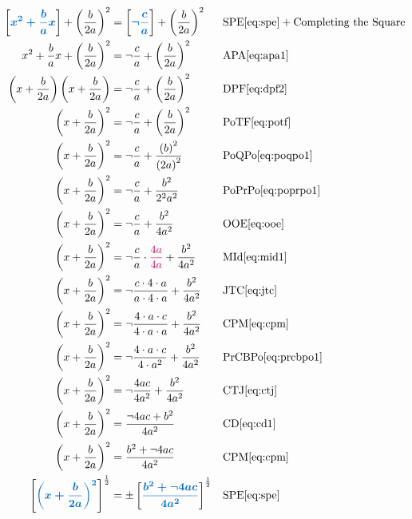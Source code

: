 \documentclass[20150903-160354-rs2.2-MarksMathNotebook.tex]{subfiles}
\begin{document}
\begin{align*}
\farg{x^2+\dfrac{b}{a}x}+\left( \dfrac{b}{2a} \right)^2 &= \farg{\neg \dfrac{c}{a}} + \left( \dfrac{b}{2a} \right)^2 && \text{SPE} \eqref{eq:spe}+ \text{Completing the Square} \\
x^2+\dfrac{b}{a}x +\left( \dfrac{b}{2a} \right)^2 &= \neg \dfrac{c}{a}+ \left( \dfrac{b}{2a} \right)^2 && \text{APA} \eqref{eq:apa1} \\
\left( x+ \dfrac{b}{2a} \right) \left( x+ \dfrac{b}{2a} \right)& = \neg \dfrac{c}{a} + \left( \dfrac{b}{2a} \right)^2 && \text{DPF} \eqref{eq:dpf2} \\
\left( x+ \dfrac{b}{2a} \right)^2 &=\neg \dfrac{c}{a} + \left( \dfrac{b}{2a} \right)^2 && \text{PoTF} \eqref{eq:potf} \\
\left( x+ \dfrac{b}{2a} \right)^2 &=\neg \dfrac{c}{a} +  \dfrac{\left(b \right)^2}{\left(2a \right)^2}  && \text{PoQPo} \eqref{eq:poqpo1} \\
\left( x+ \dfrac{b}{2a} \right)^2 &=\neg \dfrac{c}{a} +  \dfrac{b^2}{2^2a^2} && \text{PoPrPo} \eqref{eq:poprpo1} \\
\left( x+ \dfrac{b}{2a} \right)^2 &=\neg \dfrac{c}{a} +  \dfrac{b^2}{4a^2} && \text{OOE} \eqref{eq:ooe} \\
\left( x+ \dfrac{b}{2a} \right)^2 &=\neg \dfrac{c}{a} \cdot {\color{sthlmRed}\dfrac{4a}{4a}} +  \dfrac{b^2}{4a^2}  && \text{MId} \eqref{eq:mid1} \\
\left( x+ \dfrac{b}{2a} \right)^2 &=\neg \dfrac{c \cdot 4 \cdot a}{a \cdot 4 \cdot a} +  \dfrac{b^2}{4a^2} && \text{JTC} \eqref{eq:jtc} \\
\left( x+ \dfrac{b}{2a} \right)^2 &=\neg \dfrac{4 \cdot a \cdot c}{4 \cdot a \cdot a} +  \dfrac{b^2}{4a^2}  && \text{CPM} \eqref{eq:cpm} \\
\left( x+ \dfrac{b}{2a} \right)^2 &=\neg \dfrac{4 \cdot a \cdot c}{4 \cdot a^2} +  \dfrac{b^2}{4a^2} && \text{PrCBPo} \eqref{eq:prcbpo1} \\
\left( x+ \dfrac{b}{2a} \right)^2 &=\neg \dfrac{4 a c}{4a^2} +  \dfrac{b^2}{4a^2} && \text{CTJ} \eqref{eq:ctj} \\
\left( x+ \dfrac{b}{2a} \right)^2 &= \dfrac{\neg 4ac+b^2}{4a^2} && \text{CD} \eqref{eq:cd1} \\
\left( x+ \dfrac{b}{2a} \right)^2 &= \dfrac{b^2+ \neg 4ac}{4a^2} && \text{CPM} \eqref{eq:cpm} \\
\farg{\left( x+ \dfrac{b}{2a} \right)^2}^{\frac{1}{2}} &=\pm \farg{\dfrac{b^2+ \neg 4ac}{4a^2}}^{\frac{1}{2}} && \text{SPE} \eqref{eq:spe} \\

\end{align*}
\end{document}
